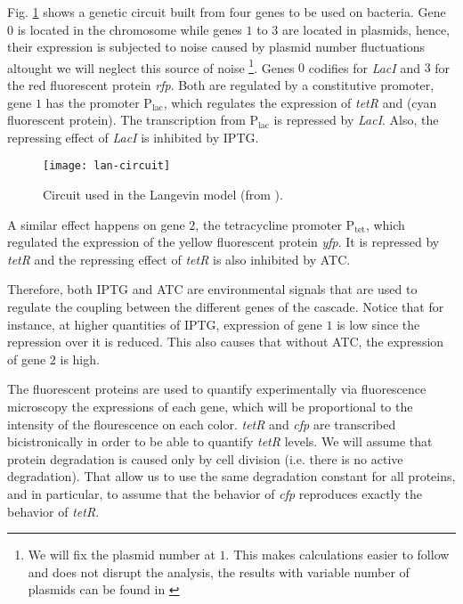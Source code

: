 
Fig. \ref{fig:lan-circuit} shows a genetic circuit built from four genes to be used on bacteria. Gene $0$ is located in the chromosome while genes $1$ to $3$ are located in plasmids, hence, their expression is subjected to noise caused by plasmid number fluctuations altought we will neglect this source of noise \footnote{We will fix the plasmid number at $1$. This makes calculations easier to follow and does not disrupt the analysis, the results with variable number of plasmids can be found in \cite{pedraza05}}. Genes $0$ codifies for \textit{LacI} and $3$ for the red fluorescent protein \textit{rfp}. Both are regulated by a constitutive promoter, gene $1$ has the promoter P$_\text{lac}$, which regulates the expression of \textit{tetR} and  (cyan fluorescent protein). The transcription from P$_\text{lac}$ is repressed by \textit{LacI}. Also, the repressing effect of \textit{LacI} is inhibited by IPTG.

\begin{figure}[H]
  \centering
  \texttt{[image: lan-circuit]}
  \caption[Circuit used for the Langevin model]{\label{fig:lan-circuit} Circuit used in the Langevin model (from \cite{pedraza05}).}
\end{figure}

A similar effect happens on gene $2$, the tetracycline promoter P$_\text{tet}$, which regulated the expression of the yellow fluorescent protein \textit{yfp}. It is repressed by \textit{tetR} and the repressing effect of \textit{tetR} is also inhibited by ATC.

Therefore, both IPTG and ATC are environmental signals that are used to regulate the coupling between the different genes of the cascade. Notice that for instance, at higher quantities of IPTG, expression of gene $1$ is low since the repression over it is reduced. This also causes that without ATC, the expression of gene $2$ is high. 

The fluorescent proteins are used to quantify experimentally via fluorescence microscopy the expressions of each gene, which will be proportional to the intensity of the flourescence on each color. \textit{tetR} and \textit{cfp} are transcribed bicistronically in order to be able to quantify \textit{tetR} levels. We will assume that protein degradation is caused only by cell division (i.e. there is no active degradation). That allow us to use the same degradation constant for all proteins, and in particular, to assume that the behavior of \textit{cfp} reproduces exactly the behavior of \textit{tetR}. 

